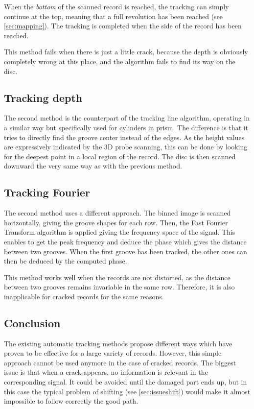 When the \emph{bottom} of the scanned record is reached, the tracking can simply continue at the top, meaning that a full revolution has been reached (see \autoref{sec:mapping}). The tracking is completed when the side of the record has been reached.

This method fails when there is just a little crack, because the depth is obviously completely wrong at this place, and the algorithm fails to find its way on the disc.

\subsection{Tracking depth}

The second method is the counterpart of the tracking line algorithm, operating in a similar way but specifically used for cylinders in \gls{prism}. The difference is that it tries to directly find the groove center instead of the edges. As the height values are expressively indicated by the 3D probe scanning, this can be done by looking for the deepest point in a local region of the record. The disc is then scanned downward the very same way as with the previous method.

\subsection{Tracking Fourier}

The second method uses a different approach. The binned image is scanned horizontally, giving the groove shapes for each row. Then, the Fast Fourier Transform algorithm is applied giving the frequency space of the signal. This enables to get the peak frequency and deduce the phase which gives the distance between two grooves. When the first groove has been tracked, the other ones can then be deduced by the computed phase.

This method works well when the records are not distorted, as the distance between two grooves remains invariable in the same row. Therefore, it is also inapplicable for cracked records for the same reasons.

\subsection{Conclusion}

The existing automatic tracking methods propose different ways which have proven to be effective for a large variety of records. However, this simple approach cannot be used anymore in the case of cracked records. The biggest issue is that when a crack appears, no information is relevant in the corresponding signal. It could be avoided until the damaged part ends up, but in this case the typical problem of shifting (see \autoref{sec:issueshift}) would make it almost impossible to follow correctly the good path.

